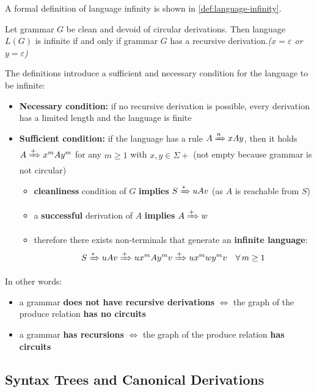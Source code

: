 \documentclass[english]{article}
\begin{document}
A formal definition of language infinity is shown in \ref{def:language-infinity}.

\begin{definition}
  Let grammar \(G\) be clean and devoid of circular derivations.
  Then language \(L(G)\) is infinite if and only if grammar \(G\) has a recursive derivation.\textit{(\(x=\varepsilon\) or \(y=\varepsilon\))}
  \label{def:language-infinity}
\end{definition}

\bigskip
The definitions introduce a sufficient and necessary condition for the language to be infinite:

\begin{itemize}
  \item \textbf{Necessary condition:} if no recursive derivation is possible, every derivation has a limited length and the language is finite
  \item \textbf{Sufficient condition:} if the language has a rule \(A \xRightarrow{n} x A y\), then it holds \(A \xRightarrow{+} x^m A y^m\) for any \(m \geq 1\) with \(x, y \in \Sigma+\) (not empty because grammar is not circular)
        \begin{itemize}
          \item \textbf{cleanliness} condition of \(G\) \textbf{implies} \(S \xRightarrow{\ast} uAv\) (as \(A\) is reachable from \(S\))
          \item a \textbf{successful} derivation of \(A\) \textbf{implies} \(A \xRightarrow{+} w\)
          \item therefore there exists non-terminals that generate an \textbf{infinite language}:
                \[ S \xRightarrow{\ast} uAv \xRightarrow{+}ux^m Ay^m v \xRightarrow{+} u x^m w y^m v \quad \forall \, m \geq 1 \]
        \end{itemize}
\end{itemize}

\bigskip
In other words:

\begin{itemize}
  \item a grammar \textbf{does not have recursive derivations} \(\Longleftrightarrow\) the graph of the produce relation \textbf{has no circuits}
  \item a grammar \textbf{has recursions} \(\Longleftrightarrow\) the graph of the produce relation \textbf{has circuits}
\end{itemize}

\subsection{Syntax Trees and Canonical Derivations}
\end{document}
